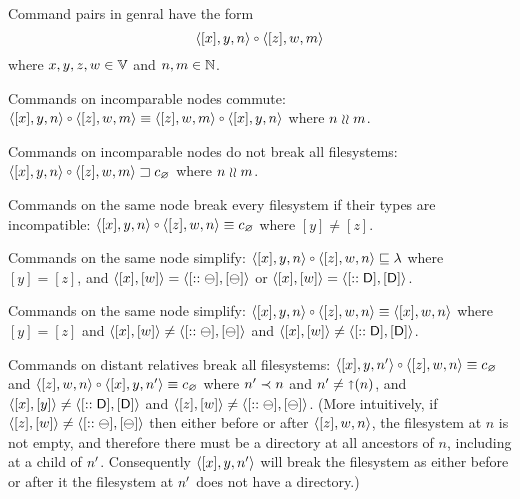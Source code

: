 

\myskip
Command pairs in genral have the form
\[ \cxynv\cc  \czwmv \]
where $x,y,z,w\in\mathbb{V}$ and $n,m\in\mathbb{N}$. 

\begin{myax}
Commands on incomparable nodes commute:
$\cxynv\cc\czwmv \equiv \czwmv\cc\cxynv$ where $n\mathrel{\wr\wr} m$.
\end{myax}

\begin{myax}
Commands on incomparable nodes do not break all filesystems:
$\wrksx{\cxynv\cc\czwmv}$ where $n\mathrel{\wr\wr} m$.
\end{myax}

\begin{myax}
Commands on the same node break every filesystem if their types are incompatible:
$\cxynv\cc\czwnv \equiv \cbrk$ where $[y]\ne [z]$.
\end{myax}

\begin{myax}
Commands on the same node simplify:
$\cxynv\cc\czwnv \eqext \emptyseq$ where $[y]=[z]$, and $\langle{[x],[w]}\rangle=\langle{[::\ominus],[\ominus]}\rangle$ 
or $\langle{[x],[w]}\rangle=\langle{[::\mathsf{D}],[\mathsf{D}]}\rangle$.
\end{myax}

\begin{myax}
Commands on the same node simplify:
$\cxynv\cc \czwnv \equiv \cxwnv$ where $[y]=[z]$ and $\langle{[x],[w]}\rangle\neq\langle{[::\ominus],[\ominus]}\rangle$ and $\langle{[x],[w]}\rangle\neq\langle{[::\mathsf{D}],[\mathsf{D}]}\rangle$.
\end{myax}

\begin{myax}
Commands on distant relatives break all filesystems:
$\cxynnv\cc\czwnv \equiv \cbrk$
and $\czwnv\cc\cxynnv \equiv\cbrk$
where $n'\prec n$ and $n'\neq\mathord{\shortuparrow}(n)$, and $\langle{[x],[y]}\rangle\neq\langle{[::\mathsf{D}],[\mathsf{D}]}\rangle$ and $\langle{[z],[w]}\rangle\neq\langle{[::\ominus],[\ominus]}\rangle$.
(More intuitively, if $\langle{[z],[w]}\rangle\neq\langle{[::\ominus],[\ominus]}\rangle$ then either before or after $\langle{[z],w,n}\rangle$, the filesystem at
$n$ is not empty, and therefore there must be a directory at all ancestors of $n$, including at a child of $n'$.
Consequently $\langle{[x],y,n'}\rangle$ will break the filesystem as either before or after it the filesystem at $n'$
does not have a directory.)
\end{myax}

